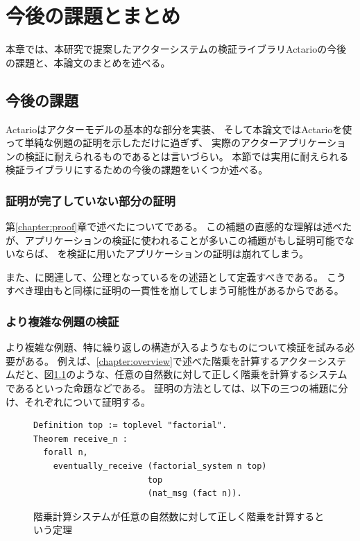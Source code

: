 \chapter{今後の課題とまとめ}
\label{chapter:conclusion}

本章では、本研究で提案したアクターシステムの検証ライブラリActarioの今後の課題と、本論文のまとめを述べる。

\section{今後の課題}

Actarioはアクターモデルの基本的な部分を実装、
そして本論文ではActarioを使って単純な例題の証明を示しただけに過ぎず、
実際のアクターアプリケーションの検証に耐えられるものであるとは言いづらい。
本節では実用に耐えられる検証ライブラリにするための今後の課題をいくつか述べる。

\subsection{証明が完了していない部分の証明}
第\ref{chapter:proof}章で述べたについてである。
この補題の直感的な理解は述べたが、アプリケーションの検証に使われることが多いこの補題がもし証明可能でないならば、
を検証に用いたアプリケーションの証明は崩れてしまう。

また、に関連して、公理となっているをの述語として定義すべきである。
こうすべき理由もと同様に証明の一貫性を崩してしまう可能性があるからである。

\subsection{より複雑な例題の検証}
より複雑な例題、特に繰り返しの構造が入るようなものについて検証を試みる必要がある。
例えば、\ref{chapter:overview}で述べた階乗を計算するアクターシステムだと、図\ref{code:conclusion:fact-n}のような、任意の自然数に対して正しく階乗を計算するシステムであるといった命題などである。
証明の方法としては、以下の三つの補題に分け、それぞれについて証明する。

\begin{figure}[tp]
\begin{lstlisting}
Definition top := toplevel "factorial".
Theorem receive_n :
  forall n,
    eventually_receive (factorial_system n top)
                       top
                       (nat_msg (fact n)).
\end{lstlisting}
  \label{code:conclusion:fact-n}
  \caption{階乗計算システムが任意の自然数に対して正しく階乗を計算するという定理}
\end{figure}

